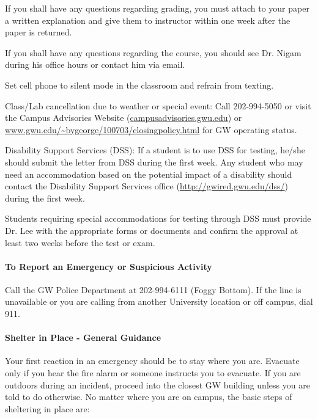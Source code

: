 \documentclass[10pt]{article}
\begin{document}
\begin{list}
\item If you shall have any questions regarding grading, you must attach to your paper a written explanation and give them to instructor within one week after the paper is returned.

\item If you shall have any questions regarding the course, you should see Dr. Nigam during his office hours or contact him via email.
\item Set cell phone to silent mode in the classroom and refrain from texting.
 
\item Class/Lab cancellation due to weather or special event: Call 202-994-5050 or visit the Campus Advisories Website (\url{campusadvisories.gwu.edu}) or \url{www.gwu.edu/~bygeorge/100703/closingpolicy.html} for GW operating status. 

\item Disability Support Services (DSS): If a student is to use DSS for testing, he/she should submit the letter from DSS during the first week. Any student who may need an accommodation based on the potential impact of a disability should contact the Disability Support Services office (\url{http://gwired.gwu.edu/dss/}) during the first week.

\item Students requiring special accommodations for testing through DSS must provide Dr. Lee with the appropriate forms or documents and confirm the approval at least two weeks before the test or exam.
\end{list}
\paragraph*{To Report an Emergency or Suspicious Activity}

Call the GW Police Department at 202-994-6111 (Foggy Bottom). If the line is unavailable or you are calling from another University location or off campus, dial 911.


\paragraph*{Shelter in Place - General Guidance}

Your first reaction in an emergency should be to stay where you are. Evacuate only if you hear the fire alarm or someone instructs you to evacuate. If you are outdoors during an incident, proceed into the closest GW building unless you are told to do otherwise. No matter where you are on campus, the basic steps of sheltering in place are:
\end{document}

